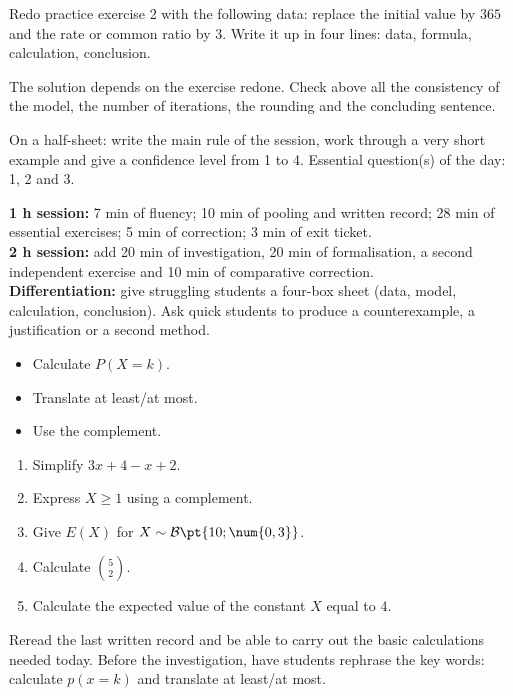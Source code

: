 
\begin{homework}Redo practice exercise 2 with the following data: replace the initial value by $365$ and the rate or common ratio by $3$. Write it up in four lines: data, formula, calculation, conclusion.\end{homework}
\begin{solution}The solution depends on the exercise redone. Check above all the consistency of the model, the number of iterations, the rounding and the concluding sentence.\end{solution}

\begin{exitticket}[3 minutes]On a half-sheet: write the main rule of the session, work through a very short example and give a confidence level from 1 to 4. Essential question(s) of the day: 1, 2 and 3.\end{exitticket}

\ifmxteacher
\begin{method}
\textbf{1 h session:} 7 min of fluency; 10 min of pooling and written record; 28 min of essential exercises; 5 min of correction; 3 min of exit ticket.\\
\textbf{2 h session:} add 20 min of investigation, 20 min of formalisation, a second independent exercise and 10 min of comparative correction.\\
\textbf{Differentiation:} give struggling students a four-box sheet (data, model, calculation, conclusion). Ask quick students to produce a counterexample, a justification or a second method.
\end{method}
\fi
{}
\begin{objectives}\begin{itemize}\item Calculate $P(X=k)$.\item Translate at least/at most.\item Use the complement.\end{itemize}\end{objectives}
\begin{fluency}\begin{enumerate}\item Simplify $3x+4-x+2$. \item Express $X\geq1$ using a complement. \item Give $E(X)$ for $X\sim\mathcal B\pt{10;\num{0,3}}$. \item Calculate $\binom52$. \item Calculate the expected value of the constant $X$ equal to $4$. \end{enumerate}\end{fluency}
\begin{prerequisites}Reread the last written record and be able to carry out the basic calculations needed today. Before the investigation, have students rephrase the key words: calculate $p(x=k)$ and translate at least/at most.\end{prerequisites}


